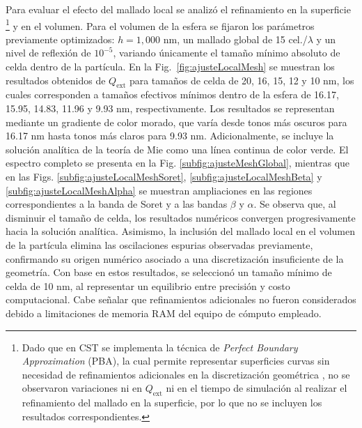 Para evaluar el efecto del mallado local se analizó el refinamiento en la superficie%
\footnote{Dado que en CST se implementa la técnica de %
	\textit{Perfect Boundary Approximation} (PBA), la cual permite representar superficies curvas sin necesidad de refinamientos adicionales en la discretización geométrica \cite{dassaultsystemesUnderstandingTimeDomain2010}, no se observaron variaciones ni en $Q_{\text{ext}}$ ni en el tiempo de simulación al realizar el refinamiento del mallado en la superficie, por lo que no se incluyen los resultados correspondientes.
}
y en el volumen. Para el volumen de la esfera se fijaron los parámetros previamente optimizados: $h=1,000$ nm, un mallado global de 15 cel./$\lambda$ y un nivel de reflexión de $10^{-5}$, variando únicamente el tamaño mínimo absoluto de celda dentro de la partícula. En la Fig.~\ref{fig:ajusteLocalMesh} se muestran los resultados obtenidos de $Q_{\text{ext}}$ para tamaños de celda de 20, 16, 15, 12 y 10 nm, los cuales corresponden a tamaños efectivos mínimos dentro de la esfera de 16.17, 15.95, 14.83, 11.96 y 9.93 nm, respectivamente. Los resultados se representan mediante un gradiente de color morado, que varía desde tonos más oscuros para 16.17 nm hasta tonos más claros para 9.93 nm.  Adicionalmente, se incluye la solución analítica de la teoría de Mie como una línea continua de color verde. El espectro completo se presenta en la Fig. \ref{subfig:ajusteMeshGlobal}, mientras que en las Figs. \ref{subfig:ajusteLocalMeshSoret}, \ref{subfig:ajusteLocalMeshBeta} y \ref{subfig:ajusteLocalMeshAlpha} se muestran ampliaciones en las regiones correspondientes a la banda de Soret y a las bandas $\beta$ y $\alpha$. Se observa que, al disminuir el tamaño de celda, los resultados numéricos convergen progresivamente hacia la solución analítica. Asimismo, la inclusión del mallado local en el volumen de la partícula elimina las oscilaciones espurias observadas previamente, confirmando su origen numérico asociado a una discretización insuficiente de la geometría. Con base en estos resultados, se seleccionó un tamaño mínimo de celda de 10 nm, al representar un equilibrio entre precisión y costo computacional. Cabe señalar que refinamientos adicionales no fueron considerados debido a limitaciones de memoria RAM del equipo de cómputo empleado.
